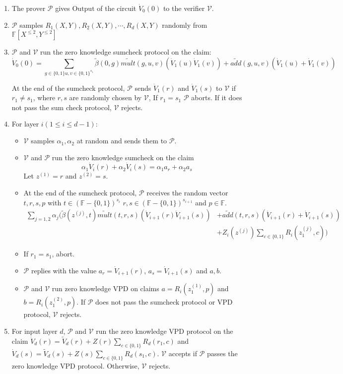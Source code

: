 \begin{enumerate} 
\item The prover $\mathcal{P}$ gives $\text{Output}$ of the circuit $\dot{V}_0(0)$ to the verifier $\mathcal{V}$. 
\item $\mathcal{P}$ samples $R_1(X, Y), R_2(X, Y), \cdots, R_d(X, Y)$ randomly from $\mathbb{F}[X^{\leqslant 2}, Y^{\leqslant 2}]$
\item $\mathcal{P}$ and $\mathcal{V}$ run the zero knowledge sumcheck protocol on the claim:
$$\dot{V}_0(0) = \sum_{g\in\{0,1\} u, v\in \{0,1\}^{s_1}}\tilde{\beta}(0, g)\tilde{mult}(g, u, v)(\dot{V}_1(u)\dot{V}_1(v))+\tilde{add}(g,u,v)(\dot{V}_1(u)+\dot{V}_1(v))$$

At the end of the sumcheck protocol, $\mathcal{P}$ sends $\dot{V}_1(r)$ and $\dot{V}_1(s)$ to $\mathcal{V}$ if $r_1 \neq s_1$, where $r, s$ are randomly chosen by $\mathcal{V}$, If $r_1 = s_1$ $\mathcal{P}$ aborts. If it does not pass the sum check protocol, $\mathcal{V}$ rejects. 

\item For layer $i(1 \leq i \leq d - 1)$:
	\begin{itemize}
	\item $\mathcal{V}$ samples $\alpha_1, \alpha_2$ at random and sends them to $\mathcal{P}$.
	\item $\mathcal{V}$ and $\mathcal{P}$ run the zero knowledge sumcheck on the claim
	$$\alpha_1 \dot{V}_i(r) + \alpha_2 \dot{V}_i(s) = \alpha_1 a_{r} + \alpha_2 a_{s}$$
	Let $z^{(1)} = r$ and $z^{(2)} = s$.
	\item At the end of the sumcheck protocol, $\mathcal{P}$ receives the random vector $t, r, s, p$ with $t \in (\mathbb{F} - \{0, 1\})^{s_i}$ $r, s \in (\mathbb{F} - \{0, 1\})^{s_{i+1}}$ and $p \in \mathbb{F}$. 
	\begin{align*}
		\sum_{j = 1, 2} \alpha_j (\tilde{\beta}(z^{(j)}, t)\tilde{mult}(t, r, s)(\dot{V}_{i+1}(r)\dot{V}_{i+1}(s))&+\tilde{add}(t,r,s)(\dot{V}_{i+1}(r)+\dot{V}_{i+1}(s))\\
 		&+ Z_i(z^{(j)})\sum\limits_{c \in \{0, 1\}}R_i(z^{(j)}_1, c))
	\end{align*}
	\item If $r_1 = s_1$, abort. 
	\item $\mathcal{P}$ replies with the value $a_r = \dot{V}_{i+1}(r)$, $a_s = \dot{V}_{i+1}(s)$ and $a, b$.
	\item $\mathcal{P}$ and $\mathcal{V}$ run zero knowledge VPD on claims $a = R_i(z^{(1)}_1, p)$ and $b = R_i(z^{(2)}_1, p)$. If $\mathcal{P}$ does not pass the sumcheck protocol or VPD protocol, $\mathcal{V}$ rejects.
	\end{itemize}

\item For input layer $d$, $\mathcal{P}$ and $\mathcal{V}$ run the zero knowledge VPD protocol on the claim $\dot{V}_d(r) = \tilde{V}_d(r) + Z(r)\sum\limits_{c \in \{0, 1\}}R_d(r_1, c)$ and $\dot{V}_d(s) = \tilde{V}_d(s) + Z(s)\sum\limits_{c \in \{0, 1\}}R_d(s_1, c)$. $\mathcal{V}$ accepts if $\mathcal{P}$ passes the zero knowledge VPD protocol. Otherwise, $\mathcal{V}$ rejects. 
\end{enumerate}

